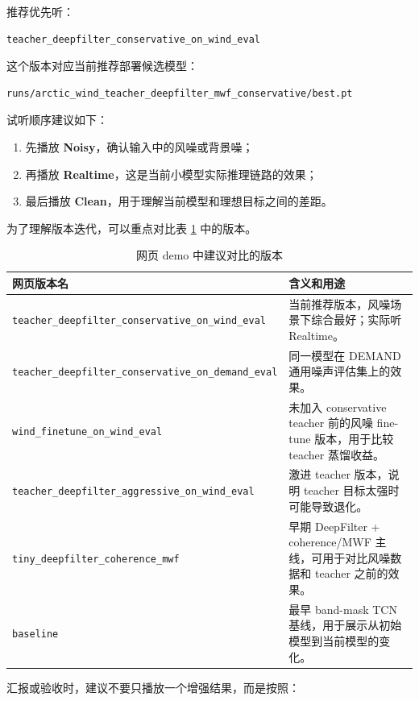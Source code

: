 \documentclass[UTF8,12pt,a4paper]{ctexart}
\begin{document}
推荐优先听：

\begin{lstlisting}
teacher_deepfilter_conservative_on_wind_eval
\end{lstlisting}

这个版本对应当前推荐部署候选模型：

\begin{lstlisting}
runs/arctic_wind_teacher_deepfilter_mwf_conservative/best.pt
\end{lstlisting}

试听顺序建议如下：

\begin{enumerate}
  \item 先播放 \textbf{Noisy}，确认输入中的风噪或背景噪；
  \item 再播放 \textbf{Realtime}，这是当前小模型实际推理链路的效果；
  \item 最后播放 \textbf{Clean}，用于理解当前模型和理想目标之间的差距。
\end{enumerate}

为了理解版本迭代，可以重点对比表 \ref{tab:demo_versions} 中的版本。

\begin{table}[H]
\centering
\caption{网页 demo 中建议对比的版本}
\label{tab:demo_versions}
\begin{tabularx}{\textwidth}{p{5.2cm}X}
\toprule
\textbf{网页版本名} & \textbf{含义和用途} \\
\midrule
\texttt{teacher\_deepfilter\_conservative\_on\_wind\_eval} & 当前推荐版本，风噪场景下综合最好；实际听 Realtime。 \\
\texttt{teacher\_deepfilter\_conservative\_on\_demand\_eval} & 同一模型在 DEMAND 通用噪声评估集上的效果。 \\
\texttt{wind\_finetune\_on\_wind\_eval} & 未加入 conservative teacher 前的风噪 fine-tune 版本，用于比较 teacher 蒸馏收益。 \\
\texttt{teacher\_deepfilter\_aggressive\_on\_wind\_eval} & 激进 teacher 版本，说明 teacher 目标太强时可能导致退化。 \\
\texttt{tiny\_deepfilter\_coherence\_mwf} & 早期 DeepFilter + coherence/MWF 主线，可用于对比风噪数据和 teacher 之前的效果。 \\
\texttt{baseline} & 最早 band-mask TCN 基线，用于展示从初始模型到当前模型的变化。 \\
\bottomrule
\end{tabularx}
\end{table}

汇报或验收时，建议不要只播放一个增强结果，而是按照：
\end{document}
